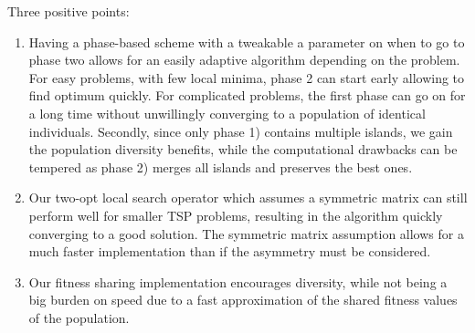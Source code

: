 \documentclass[a4paper,10pt]{article}
\newcommand{\ReplaceMe}[1]{{\color{blue}#1}}
\begin{document}
Three positive points:
\begin{enumerate}
 \item Having a phase-based scheme with a tweakable a parameter on when to go to phase two allows for an easily adaptive algorithm depending on the problem. For easy problems, with few local minima, phase 2 can start early allowing to find optimum quickly. For complicated problems, the first phase can go on for a long time without unwillingly converging to a population of identical individuals. Secondly, since only phase 1) contains multiple islands, we gain the population diversity benefits,  while the computational drawbacks can be tempered as phase 2) merges all islands and preserves the best ones.

\item Our two-opt local search operator which assumes a symmetric matrix can still perform well for smaller TSP problems, resulting in the algorithm quickly converging to a good solution. The symmetric matrix assumption allows for a much faster implementation than if the asymmetry must be considered.

\item Our fitness sharing implementation encourages diversity, while not being a big burden on speed due to a fast approximation of the shared fitness values of the population.
\end{enumerate}
\end{document}
